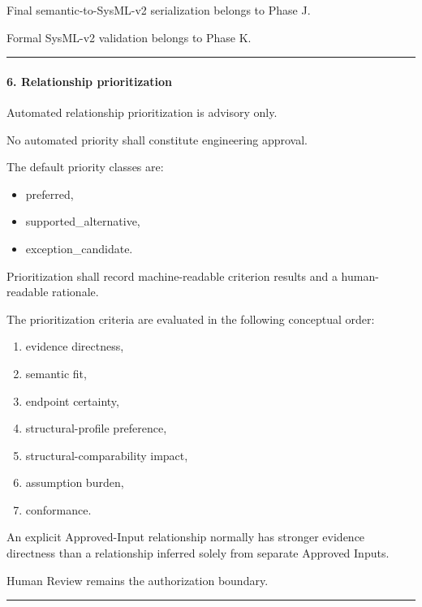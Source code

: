Final semantic-to-SysML-v2 serialization belongs to Phase J.

Formal SysML-v2 validation belongs to Phase K.

\begin{center}\rule{0.5\linewidth}{0.5pt}\end{center}

\hypertarget{6-relationship-prioritization}{%
\paragraph{6. Relationship prioritization}\label{6-relationship-prioritization}}

Automated relationship prioritization is advisory only.

No automated priority shall constitute engineering approval.

The default priority classes are:

\begin{itemize}
\tightlist
\item
  preferred,
\item
  supported\_alternative,
\item
  exception\_candidate.
\end{itemize}

Prioritization shall record machine-readable criterion results and a human-readable rationale.

The prioritization criteria are evaluated in the following conceptual order:

\begin{enumerate}
\def\labelenumi{\arabic{enumi}.}
\tightlist
\item
  evidence directness,
\item
  semantic fit,
\item
  endpoint certainty,
\item
  structural-profile preference,
\item
  structural-comparability impact,
\item
  assumption burden,
\item
  conformance.
\end{enumerate}

An explicit Approved-Input relationship normally has stronger evidence directness than a relationship inferred solely from separate Approved Inputs.

Human Review remains the authorization boundary.

\begin{center}\rule{0.5\linewidth}{0.5pt}\end{center}

